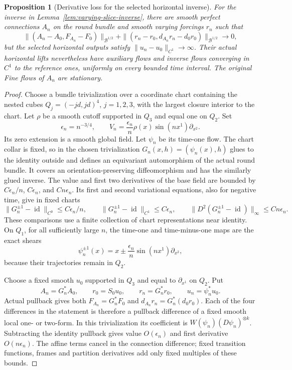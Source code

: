 \documentclass[11pt]{article}
\numberwithin{equation}{section}
\newtheorem{proposition}[theorem]{Proposition}
\theoremstyle{definition}
\theoremstyle{remark}
\begin{document}
\begin{proposition}[Derivative loss for the selected horizontal inverse]
\label{prop:horizontal-critical-loss}
For the inverse in Lemma~\ref{lem:varying-slice-inverse},
there are smooth perfect connections $A_n$ on the round
bundle and smooth varying forcings $r_n$ such that
\[
 \|(A_n-A_0,F_{A_n}-F_0)\|_{\mathcal B^{1/2}}
 +\|(r_n-r_0,d_{A_n}r_n-d_0r_0)\|_{\mathcal B^{1/2}}
 \longrightarrow0 ,
\]
but the selected horizontal outputs satisfy
$\|u_n-u_0\|_{C^1}\to\infty$.
Their actual horizontal lifts nevertheless have auxiliary
flows and inverse flows converging in $C^1$ to the
reference ones, uniformly on every bounded time interval.
The original Fine flows of $A_n$ are stationary.
\end{proposition}

\begin{proof}
Choose a bundle trivialization over a coordinate chart
containing the nested cubes $Q_j=(-jd,jd)^4$, $j=1,2,3$,
with the largest closure interior to the chart.
Let $\rho$ be a smooth cutoff supported in $Q_3$ and equal one on $Q_2$.
Set
\[
 \epsilon_n=n^{-3/4},\qquad
 V_n=\frac{\epsilon_n}{n}\rho(x)\sin(nx^1)\partial_{x^2}.
\]
Its zero extension is a smooth global field. Let $\psi_n$
be its time-one flow. The chart collar is fixed, so in
the chosen trivialization
$G_n(x,h)=(\psi_n(x),h)$ glues to the identity outside
and defines an equivariant automorphism of the actual
round bundle. It covers an orientation-preserving
diffeomorphism and has the similarly glued inverse.
The value and first two derivatives of the base
field are bounded by $C\epsilon_n/n$, $C\epsilon_n$,
and $Cn\epsilon_n$. Its first and second variational
equations, also for negative time, give in fixed charts
\[
 \|G_n^{\pm1}-\operatorname{id}\|_{C^0}
       \le C\epsilon_n/n,\qquad
 \|G_n^{\pm1}-\operatorname{id}\|_{C^1}
       \le C\epsilon_n,\qquad
 \|D^2(G_n^{\pm1}-\operatorname{id})\|_\infty
       \le Cn\epsilon_n .
\]
These comparisons use a finite collection of chart
representations near identity.
On $Q_1$, for all sufficiently large $n$, the time-one
and time-minus-one maps are the exact shears
\[
 \psi_n^{\pm1}(x)=x\pm
          \frac{\epsilon_n}{n}\sin(nx^1)\partial_{x^2},
\]
because their trajectories remain in $Q_2$.

Choose a fixed smooth $u_0$ supported in $Q_3$ and equal
to $\partial_{x^1}$ on $Q_2$. Put
\[
 A_n=G_n^*A_0,\qquad r_0=S_0u_0,\qquad
 r_n=G_n^*r_0,\qquad u_n=\psi_n^*u_0.
\]
Actual pullback gives both
$F_{A_n}=G_n^*F_0$ and
$d_{A_n}r_n=G_n^*(d_0r_0)$.
Each of the four differences in the statement is
therefore a pullback difference of a fixed smooth
local one- or two-form. In this trivialization its
coefficient is $W(\psi_n)(D\psi_n)^{\otimes k}$.
Subtracting the identity pullback gives value
$O(\epsilon_n)$ and first derivative $O(n\epsilon_n)$.
The affine terms cancel in the connection difference;
fixed transition functions, frames and partition
derivatives add only fixed multiples of these bounds.


\end{proof}
\end{document}

